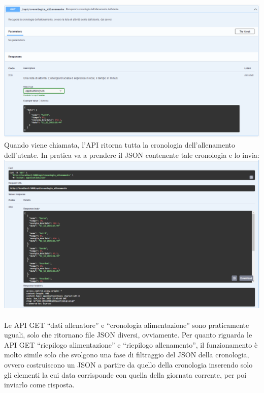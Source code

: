 \documentclass{article}
\begin{document}
   \includegraphics[scale=0.5]{doc get cronologia_allenamento.png}\\
   Quando viene chiamata, l’API ritorna tutta la cronologia dell’allenamento dell’utente. In pratica va a prendere il JSON contenente tale cronologia e lo invia:\\
   \includegraphics[scale=0.5]{risposta get cronologia_allenamento.png}\\
   \\
   Le API GET “dati allenatore” e “cronologia alimentazione” sono praticamente uguali, solo che ritornano file JSON diversi, ovviamente. Per quanto riguarda le API GET “riepilogo alimentazione” e “riepilogo allenamento”, il funzionamento è molto simile solo che svolgono una fase di filtraggio del JSON della cronologia, ovvero costruiscono un JSON a partire da quello della cronologia inserendo solo gli elementi la cui data corrisponde con quella della giornata corrente, per poi inviarlo come risposta.
\end{document}
